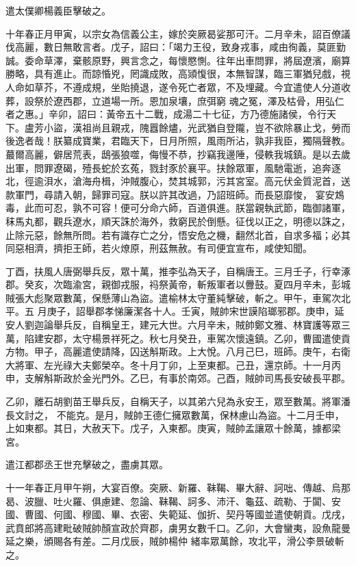 \begin{pinyinscope}
 遣太僕卿楊義臣擊破之。



 十年春正月甲寅，以宗女為信義公主，嫁於突厥曷娑那可汗。二月辛未，詔百僚議伐高麗，數日無敢言者。戊子，詔曰：「竭力王役，致身戎事，咸由徇義，莫匪勤誠。委命草澤，棄骸原野，興言念之，每懷愍惻。往年出車問罪，將屆遼濱，廟算勝略，具有進止。而諒惛兇，罔識成敗，高熲愎很，本無智謀，臨三軍猶兒戲，視人命如草芥，不遵成規，坐貽撓退，遂令死亡者眾，不及埋藏。今宜遣使人分道收葬，設祭於遼西郡，立道場一所。恩加泉壤，庶弭窮
 魂之冤，澤及枯骨，用弘仁者之惠。」辛卯，詔曰：黃帝五十二戰，成湯二十七征，方乃德施諸侯，令行天下。盧芳小盜，漢祖尚且親戎，隗囂餘燼，光武猶自登隴，豈不欲除暴止戈，勞而後逸者哉！朕纂成寶業，君臨天下，日月所照，風雨所沾，孰非我臣，獨隔聲教。蕞爾高麗，僻居荒表，鴟張狼噬，侮慢不恭，抄竊我邊陲，侵軼我城鎮。是以去歲出軍，問罪遼碣，殪長蛇於玄菟，戮封豕於襄平。扶餘眾軍，風馳電逝，追奔逐北，徑逾浿水，滄海舟楫，沖賊腹心，焚其城郭，污其宮室。高元伏金質泥首，送款軍門，尋請入朝，歸罪司寇。朕以許其改過，乃詔班師。而長惡靡悛，
 宴安鴆毒，此而可忍，孰不可容！便可分命六師，百道俱進。朕當親執武節，臨御諸軍，秣馬丸都，觀兵遼水，順天誅於海外，救窮民於倒懸。征伐以正之，明德以誅之，止除元惡，餘無所問。若有識存亡之分，悟安危之機，翻然北首，自求多福；必其同惡相濟，擠拒王師，若火燎原，刑茲無赦。有司便宜宣布，咸使知聞。



 丁酉，扶風人唐弼舉兵反，眾十萬，推李弘為天子，自稱唐王。三月壬子，行幸涿郡。癸亥，次臨渝宮，親御戎服，祃祭黃帝，斬叛軍者以釁鼓。夏四月辛未，彭城賊張大彪聚眾數萬，保懸薄山為盜。遣榆林太守董純擊破，斬之。甲午，車駕次北平。五
 月庚子，詔舉郡孝悌廉潔各十人。壬寅，賊帥宋世謨陷瑯邪郡。庚申，延安人劉迦論舉兵反，自稱皇王，建元大世。六月辛未，賊帥鄭文雅、林寶護等眾三萬，陷建安郡，太守楊景祥死之。秋七月癸丑，車駕次懷遠鎮。乙卯，曹國遣使貢方物。甲子，高麗遣使請降，囚送斛斯政。上大悅。八月己巳，班師。庚午，右衛大將軍、左光祿大夫鄭榮卒。冬十月丁卯，上至東都。己丑，還京師。十一月丙申，支解斛斯政於金光門外。乙巳，有事於南郊。己酉，賊帥司馬長安破長平郡。



 乙卯，離石胡劉苗王舉兵反，自稱天子，以其弟六兒為永安王，眾至數萬。將軍潘長文討之，
 不能克。是月，賊帥王德仁擁眾數萬，保林慮山為盜。十二月壬申，上如東都。其日，大赦天下。戊子，入東都。庚寅，賊帥孟讓眾十餘萬，據都梁宮。



 遣江都郡丞王世充擊破之，盡虜其眾。



 十一年春正月甲午朔，大宴百僚。突厥、新羅、靺鞨、畢大辭、訶咄、傳越、烏那曷、波臘、吐火羅、俱慮建、忽論、靺鞨、訶多、沛汗、龜茲、疏勒、于闐、安國、曹國、何國、穆國、畢、衣密、失範延、伽折、契丹等國並遣使朝貢。戊戌，武賁郎將高建毗破賊帥顏宣政於齊郡，虜男女數千口。乙卯，大會蠻夷，設魚龍曼延之樂，頒賜各有差。二月戊辰，賊帥楊仲
 緒率眾萬餘，攻北平，滑公李景破斬之。




\end{pinyinscope}
